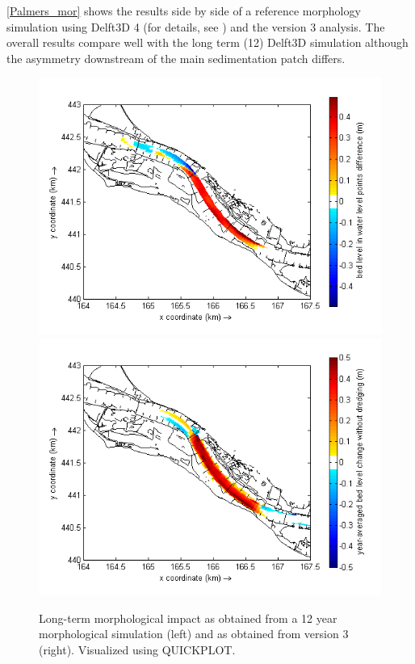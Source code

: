 
\autoref{Palmers_mor} shows the results side by side of a reference morphology simulation using Delft3D 4 (for details, see \citet{GiriJagers2022}) and the \dfmi version 3 analysis.
The overall \dfmi results compare well with the long term (\SI{12}{\year}) Delft3D simulation although the asymmetry downstream of the main sedimentation patch differs.

\begin{figure}[H]
\includegraphics[width=\columnwidth/2]{figures/Palmerswaard_delft3d.png}
\includegraphics[width=\columnwidth/2]{figures/Palmerswaard_dfastmi.png}
\caption{Long-term morphological impact as obtained from a 12 year morphological simulation (left) and as obtained from \dfmi version 3 (right).
Visualized using QUICKPLOT.}
\label{Palmers_mor}
\end{figure}




